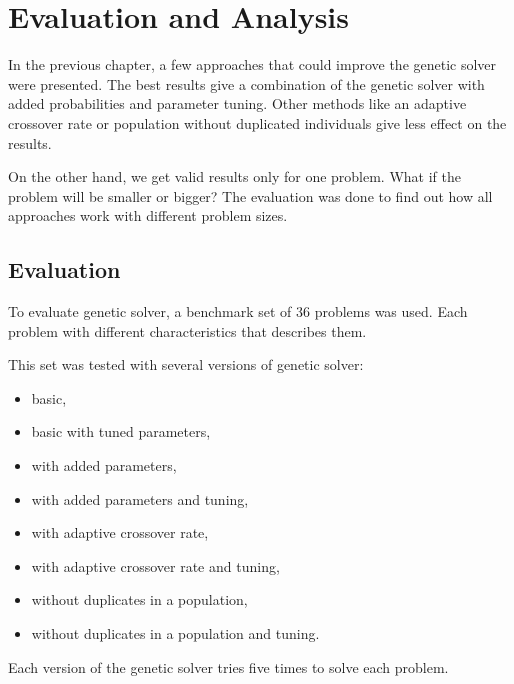 \chapter{Evaluation and Analysis}

In the previous chapter, a few approaches that could improve the genetic solver were presented.
The best results give a combination of the genetic solver with added probabilities and parameter tuning.
Other methods like an adaptive crossover rate or population without duplicated individuals give less effect on the results.

On the other hand, we get valid results only for one problem. What if the problem will be smaller or bigger?
The evaluation was done to find out how all approaches work with different problem sizes. 
\section{Evaluation}
To evaluate genetic solver, a benchmark set of 36 problems was used.
Each problem with different characteristics that describes them.

This set was tested with several versions of genetic solver:
\begin{itemize}
	\item basic,
	\item basic with tuned parameters,
	\item with added parameters,
	\item with added parameters and tuning,
	\item with adaptive crossover rate,
	\item with adaptive crossover rate and tuning,
	\item without duplicates in a population,
	\item without duplicates in a population and tuning.
\end{itemize}

Each version of the genetic solver tries five times to solve each problem.

